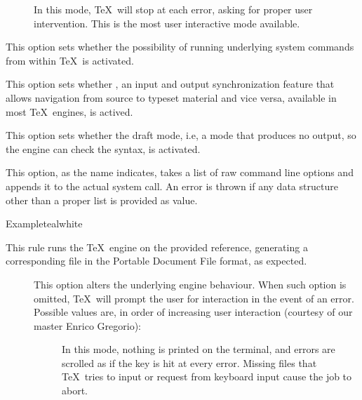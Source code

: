 \begin{description}
\begin{description}
\begin{description}
\item[] In this mode, \TeX\ will stop at each error, asking for proper user intervention. This is the most user interactive mode available.
\end{description}

\item[\rpsbox{shell}] This option sets whether the possibility of running underlying system commands from within \TeX\ is activated.

\item[\rpsbox{synctex}] This option sets whether , an input and output synchronization feature that allows navigation from source to typeset material and vice versa, available in most \TeX\ engines, is actived.

\item[\rpsbox{draft}] This option sets whether the draft mode, i.e, a mode that produces no output, so the engine can check the syntax, is activated.

\item[\abox{options}] This option, as the name indicates, takes a list of raw command line options and appends it to the actual system call. An error is thrown if any data structure other than a proper list is provided as value.
\end{description}

\begin{codebox}{Example}{teal}{\icnote}{white}
\end{codebox}

\item[\rulebox{pdflatex}{Marco Daniel, Paulo Cereda}] This rule runs the  \TeX\ engine on the provided  reference, generating a corresponding file in the Portable Document File format, as expected.

\begin{description}
\item[] This option alters the underlying engine behaviour. When such option is omitted, \TeX\ will prompt the user for interaction in the event of an error. Possible values are, in order of increasing user interaction (courtesy of our master Enrico Gregorio):

\begin{description}
\item[] In this mode, nothing is printed on the terminal, and errors are scrolled as if the  key is hit at every error. Missing files that \TeX\ tries to input or request from keyboard input cause the job to abort.


\end{description}
\end{description}
\end{description}
